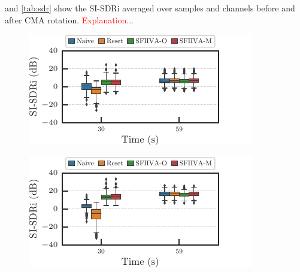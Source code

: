 \documentclass[sip,biber]{now-journal}
\newcommand{\todo}[1]{\textcolor{red}{#1}}
\begin{document}
 and \cref{tab:sdr} show the SI-SDRi averaged over samples and channels before and after CMA rotation.
\todo{Explanation...}
\begin{figure}[t]
  \begin{minipage}[t]{.45\textwidth}
    \centering\includegraphics{figures/plots/online/box_900.pdf}\label{fig:plot:hist:900}
  \end{minipage}
  \begin{minipage}[t]{.45\textwidth}
    \centering\includegraphics{figures/plots/online/box_950.pdf}\label{fig:plot:hist:950}
  \end{minipage}
  \vspace{.5em}


\end{figure}
\end{document}
